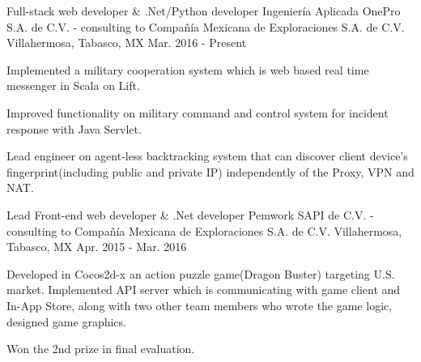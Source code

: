 


\begin{cventries}


\cventry
{Full-stack web developer \& .Net/Python developer} %
{Ingeniería Aplicada OnePro S.A. de C.V. - consulting to Compañía Mexicana de Exploraciones S.A. de C.V.} %
{Villahermosa, Tabasco, MX} %
{Mar. 2016 - Present} %
{ %
\begin{cvitems}
\item {Implemented a military cooperation system which is web based real time messenger in Scala on Lift.}
\item {Improved functionality on military command and control system for incident response with Java Servlet.}
\item {Lead engineer on agent-less backtracking system that can discover client device's fingerprint(including public and private IP) independently of the Proxy, VPN and NAT.}
\end{cvitems}
}


\cventry
{Lead Front-end web developer \& .Net developer} %
{Pemwork SAPI de C.V. - consulting to Compañía Mexicana de Exploraciones S.A. de C.V.} %
{Villahermosa, Tabasco, MX} %
{Apr. 2015 - Mar. 2016} %
{ %
\begin{cvitems}
\item {Developed in Cocos2d-x an action puzzle game(Dragon Buster) targeting U.S. market. Implemented API server which is communicating with game client and In-App Store, along with two other team members who wrote the game logic, designed game graphics.}
\item {Won the 2nd prize in final evaluation.}
\end{cvitems}
}


\end{cventries}
